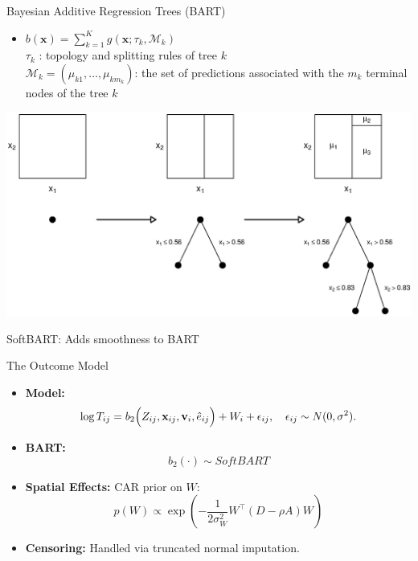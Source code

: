 \documentclass{beamer}
\begin{document}
\begin{frame}{Bayesian Additive Regression Trees (BART)}
   
    \begin{itemize}
   
    \vfill \item
      \(b(\mathbf{x}) = \sum_{k=1}^{K}g(\mathbf{x} ; \tau_k, \mathcal{M}_k)\)
   \\
    \vspace{6pt}
        \(\tau_k\) : topology and splitting rules of tree \(k\)
  \\  \vspace{6pt} 
        \(\mathcal{M}_k = (\mu_{k1}, \dots, \mu_{km_k})\): the set of predictions associated with the \(m_k\) terminal nodes of the tree \(k\) 
    \end{itemize}
   
    
    
    \begin{center}\includegraphics[width=.6\textwidth]{pics/BARTdiagram.eps} \end{center}
   \alert{SoftBART: Adds smoothness to BART}
\end{frame}
\begin{frame}{The Outcome Model}
  \begin{itemize}
    \vfill \item \textbf{Model:} 
      \[
      \log T_{ij} = b_2\Bigl(Z_{ij},\mathbf{x}_{ij},\mathbf{v}_i,\hat{e}_{ij}\Bigr) + W_i + \epsilon_{ij},\quad \epsilon_{ij}\sim N(0,\sigma^2).
      \]
      
    \vfill \item \textbf{BART:} 
      \[
      b_2(\cdot) \sim SoftBART
      \]
      
      \vfill \item \textbf{Spatial Effects:} CAR prior on \(W\): 
      \[
      p(W) \propto \exp\left(-\frac{1}{2\sigma_W^2} W^\top (D - \rho A) W\right)
      \]
      
      \vfill \item \textbf{Censoring:} Handled via truncated normal imputation.
\end{itemize}
\end{frame}
\end{document}
